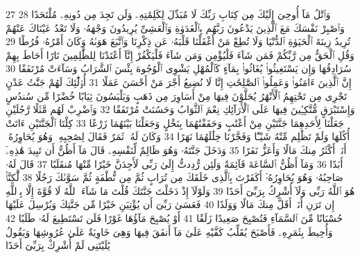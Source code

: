 {\tiny\colorbox{cl_aya}{27}} وَٱتْلُ مَآ أُوحِىَ إِلَيْكَ مِن كِتَابِ رَبِّكَ لَا مُبَدِّلَ لِكَلِمَٰتِهِۦ وَلَن تَجِدَ مِن دُونِهِۦ مُلْتَحَدًا
{\tiny\colorbox{cl_aya}{28}} وَٱصْبِرْ نَفْسَكَ مَعَ ٱلَّذِينَ يَدْعُونَ رَبَّهُم بِٱلْغَدَوٰةِ وَٱلْعَشِىِّ يُرِيدُونَ وَجْهَهُۥ وَلَا تَعْدُ عَيْنَاكَ عَنْهُمْ تُرِيدُ زِينَةَ ٱلْحَيَوٰةِ ٱلدُّنْيَا وَلَا تُطِعْ مَنْ أَغْفَلْنَا قَلْبَهُۥ عَن ذِكْرِنَا وَٱتَّبَعَ هَوَىٰهُ وَكَانَ أَمْرُهُۥ فُرُطًا
{\tiny\colorbox{cl_aya}{29}} وَقُلِ ٱلْحَقُّ مِن رَّبِّكُمْ فَمَن شَآءَ فَلْيُؤْمِن وَمَن شَآءَ فَلْيَكْفُرْ إِنَّآ أَعْتَدْنَا لِلظَّٰلِمِينَ نَارًا أَحَاطَ بِهِمْ سُرَادِقُهَا وَإِن يَسْتَغِيثُوا۟ يُغَاثُوا۟ بِمَآءٍ كَٱلْمُهْلِ يَشْوِى ٱلْوُجُوهَ بِئْسَ ٱلشَّرَابُ وَسَآءَتْ مُرْتَفَقًا
{\tiny\colorbox{cl_aya}{30}} إِنَّ ٱلَّذِينَ ءَامَنُوا۟ وَعَمِلُوا۟ ٱلصَّٰلِحَٰتِ إِنَّا لَا نُضِيعُ أَجْرَ مَنْ أَحْسَنَ عَمَلًا
{\tiny\colorbox{cl_aya}{31}} أُو۟لَٰٓئِكَ لَهُمْ جَنَّٰتُ عَدْنٍ تَجْرِى مِن تَحْتِهِمُ ٱلْأَنْهَٰرُ يُحَلَّوْنَ فِيهَا مِنْ أَسَاوِرَ مِن ذَهَبٍ وَيَلْبَسُونَ ثِيَابًا خُضْرًا مِّن سُندُسٍ وَإِسْتَبْرَقٍ مُّتَّكِـِٔينَ فِيهَا عَلَى ٱلْأَرَآئِكِ نِعْمَ ٱلثَّوَابُ وَحَسُنَتْ مُرْتَفَقًا
{\tiny\colorbox{cl_aya}{32}} وَٱضْرِبْ لَهُم مَّثَلًا رَّجُلَيْنِ جَعَلْنَا لِأَحَدِهِمَا جَنَّتَيْنِ مِنْ أَعْنَٰبٍ وَحَفَفْنَٰهُمَا بِنَخْلٍ وَجَعَلْنَا بَيْنَهُمَا زَرْعًا
{\tiny\colorbox{cl_aya}{33}} كِلْتَا ٱلْجَنَّتَيْنِ ءَاتَتْ أُكُلَهَا وَلَمْ تَظْلِم مِّنْهُ شَيْـًٔا وَفَجَّرْنَا خِلَٰلَهُمَا نَهَرًا
{\tiny\colorbox{cl_aya}{34}} وَكَانَ لَهُۥ ثَمَرٌ فَقَالَ لِصَٰحِبِهِۦ وَهُوَ يُحَاوِرُهُۥٓ أَنَا۠ أَكْثَرُ مِنكَ مَالًا وَأَعَزُّ نَفَرًا
{\tiny\colorbox{cl_aya}{35}} وَدَخَلَ جَنَّتَهُۥ وَهُوَ ظَالِمٌ لِّنَفْسِهِۦ قَالَ مَآ أَظُنُّ أَن تَبِيدَ هَٰذِهِۦٓ أَبَدًا
{\tiny\colorbox{cl_aya}{36}} وَمَآ أَظُنُّ ٱلسَّاعَةَ قَآئِمَةً وَلَئِن رُّدِدتُّ إِلَىٰ رَبِّى لَأَجِدَنَّ خَيْرًا مِّنْهَا مُنقَلَبًا
{\tiny\colorbox{cl_aya}{37}} قَالَ لَهُۥ صَاحِبُهُۥ وَهُوَ يُحَاوِرُهُۥٓ أَكَفَرْتَ بِٱلَّذِى خَلَقَكَ مِن تُرَابٍ ثُمَّ مِن نُّطْفَةٍ ثُمَّ سَوَّىٰكَ رَجُلًا
{\tiny\colorbox{cl_aya}{38}} لَّٰكِنَّا۠ هُوَ ٱللَّهُ رَبِّى وَلَآ أُشْرِكُ بِرَبِّىٓ أَحَدًا
{\tiny\colorbox{cl_aya}{39}} وَلَوْلَآ إِذْ دَخَلْتَ جَنَّتَكَ قُلْتَ مَا شَآءَ ٱللَّهُ لَا قُوَّةَ إِلَّا بِٱللَّهِ إِن تَرَنِ أَنَا۠ أَقَلَّ مِنكَ مَالًا وَوَلَدًا
{\tiny\colorbox{cl_aya}{40}} فَعَسَىٰ رَبِّىٓ أَن يُؤْتِيَنِ خَيْرًا مِّن جَنَّتِكَ وَيُرْسِلَ عَلَيْهَا حُسْبَانًا مِّنَ ٱلسَّمَآءِ فَتُصْبِحَ صَعِيدًا زَلَقًا
{\tiny\colorbox{cl_aya}{41}} أَوْ يُصْبِحَ مَآؤُهَا غَوْرًا فَلَن تَسْتَطِيعَ لَهُۥ طَلَبًا
{\tiny\colorbox{cl_aya}{42}} وَأُحِيطَ بِثَمَرِهِۦ فَأَصْبَحَ يُقَلِّبُ كَفَّيْهِ عَلَىٰ مَآ أَنفَقَ فِيهَا وَهِىَ خَاوِيَةٌ عَلَىٰ عُرُوشِهَا وَيَقُولُ يَٰلَيْتَنِى لَمْ أُشْرِكْ بِرَبِّىٓ أَحَدًا
